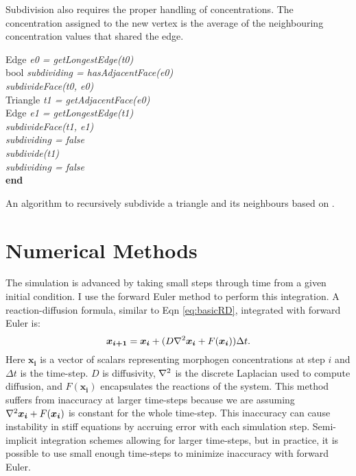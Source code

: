 Subdivision also requires the proper handling of concentrations. The concentration assigned to the new vertex is the average of the neighbouring concentration values that shared the edge.

\begin{algorithm}[!ht]
  {
   Edge \textit{e0 = getLongestEdge(t0)}\\
   bool \textit{subdividing = hasAdjacentFace(e0)}\\
   \textit{subdivideFace(t0, e0)}\\
   {
    {
      Triangle \textit{t1 = getAdjacentFace(e0)}\\
      Edge \textit{e1 = getLongestEdge(t1)}\\
      {
       \textit{subdivideFace(t1, e1)}\\
       \textit{subdividing = false}\\
      }{
        \textit{subdivide(t1)}\\   
      }
    }{
     \textit{subdividing = false}\\
    }
   }
  }
  \textbf{end}
  \caption{An algorithm to recursively subdivide a triangle and its neighbours based on \citep{rivara1998}.}
  \label{alg:subdivisionAlgorithm}
\end{algorithm}

\section{Numerical Methods}
The simulation is advanced by taking small steps through time from a given initial condition. I use the forward Euler method to perform this integration. A reaction-diffusion formula, similar to Eqn \ref{eq:basicRD}, integrated with forward Euler is:
\begin{equation}
	\boldsymbol{x_{i+1}} = \boldsymbol{x_{i}} + (D\nabla^2{}\boldsymbol{x_i} + F(\boldsymbol{x_i}))\Delta t. \\
\end{equation}
Here $\boldsymbol{x_i}$ is a vector of scalars representing morphogen concentrations at step $i$ and $\Delta t$ is the time-step. $D$ is diffusivity, $\nabla^2{}$ is the discrete Laplacian used to compute diffusion, and $F(\boldsymbol{x_i})$ encapsulates the reactions of the system. This method suffers from inaccuracy at larger time-steps because we are assuming $\nabla^2{}\boldsymbol{x_i} + F(\boldsymbol{x_i})$ is constant for the whole time-step. This inaccuracy can cause instability in stiff equations by accruing error with each simulation step. Semi-implicit integration schemes \citep{Nie2006} allowing for larger time-steps, but in practice, it is possible to use small enough time-steps to minimize inaccuracy with forward Euler. 